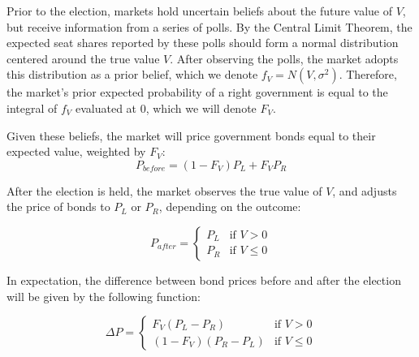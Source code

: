 \documentclass[12pt]{article}
\begin{document}
Prior to the election, markets hold uncertain beliefs about the future value of $V$, but receive information from a series of polls. By the Central Limit Theorem, the expected seat shares reported by these polls should form a normal distribution centered around the true value $V$. After observing the polls, the market adopts this distribution as a prior belief, which we denote $f_V = N(V,\sigma^2)$. Therefore, the market's prior expected probability of a right government is equal to the integral of $f_V$ evaluated at $0$, which we will denote $F_V$.


Given these beliefs, the market will price government bonds equal to their expected value, weighted by $F_V$:
\begin{equation*}
P_{before} = (1-F_V)P_L + F_V P_R
\end{equation*}

After the election is held, the market observes the true value of $V$, and adjusts the price of bonds to $P_L$ or $P_R$, depending on the outcome:

\[
  P_{after} =
  \begin{cases}
                                   P_L & \text{if $V > 0$} \\
                                   P_R & \text{if $V \leq 0$} 
  \end{cases}
\]

In expectation, the difference between bond prices before and after the election will be given by the following function:

\begin{equation}
  \Delta P =
  \begin{cases}
                                   F_V(P_L-P_R) & \text{if $V > 0$} \\
                                   (1-F_V)(P_R-P_L)& \text{if $V \leq 0$}
  \end{cases}
\end{equation}
\end{document}
